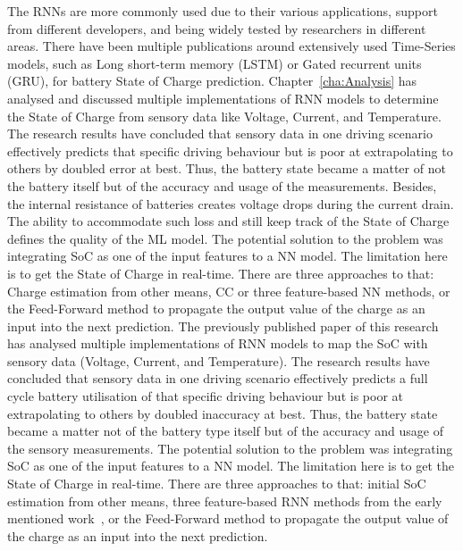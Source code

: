 %
%
The RNNs are more commonly used due to their various applications, support from different developers, and being widely tested by researchers in different areas.
There have been multiple publications around extensively used Time-Series models, such as Long short-term memory (LSTM) or Gated recurrent units (GRU), for battery State of Charge prediction.
{
Chapter~\ref{cha:Analysis} has analysed and discussed multiple implementations of RNN models to determine the State of Charge from sensory data like Voltage, Current, and Temperature.
The research results have concluded that sensory data in one driving scenario effectively predicts that specific driving behaviour but is poor at extrapolating to others by doubled error at best.
Thus, the battery state became a matter of not the battery itself but of the accuracy and usage of the measurements.
Besides, the internal resistance of batteries creates voltage drops during the current drain.
The ability to accommodate such loss and still keep track of the State of Charge defines the quality of the ML model.
The potential solution to the problem was integrating SoC as one of the input features to a NN model.
The limitation here is to get the State of Charge in real-time.
There are three approaches to that: Charge estimation from other means, CC or three feature-based NN methods, or the Feed-Forward method to propagate the output value of the charge as an input into the next prediction.
} {
The previously published paper of this research~\cite{sadykov_practical_2022} has analysed multiple implementations of RNN models to map the SoC with sensory data (Voltage, Current, and Temperature).
The research results have concluded that sensory data in one driving scenario effectively predicts a full cycle battery utilisation of that specific driving behaviour but is poor at extrapolating to others by doubled inaccuracy at best.
Thus, the battery state became a matter not of the battery type itself but of the accuracy and usage of the sensory measurements.
The potential solution to the problem was integrating SoC as one of the input features to a NN model.
The limitation here is to get the State of Charge in real-time.
There are three approaches to that: initial SoC estimation from other means, three feature-based RNN methods from the early mentioned work~\cite{sadykov_practical_2022}, or the Feed-Forward method to propagate the output value of the charge as an input into the next prediction.
}


